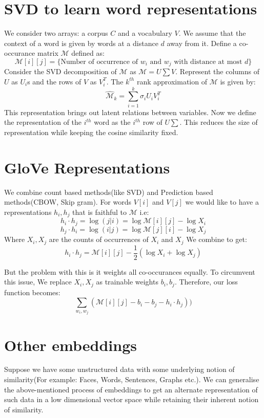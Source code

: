 \section{SVD to learn word representations}
We consider two arrays: a corpus $C$ and a vocabulary $V$. We assume that the context of a word is given by words at a distance $d$ away from it. Define a co-occurance matrix $\mathcal M$ defined as:
$$\mathcal M[i][j]=\{\text{Number of occurrence of }w_i\text{ and }w_j\text{ with distance at most }d\}$$
Consider the SVD decomposition of $\mathcal M$ as $\mathcal M=U\sum V$. Represent the columns of $U$ as $U_i$s and the rows of $V$ as $V_i^T$. The $k^{th}$ rank approximation of $\mathcal M$ is given by:
$$\hat{\mathcal M}_k=\sum_{i=1}^k \sigma_i U_iV_i^T $$
This representation brings out latent relations between variables. Now we define the representation  of the $i^{th}$ word as the $i^{th}$ row of $U\sum$. This reduces the size of representation while keeping the cosine similarity fixed.















\section{GloVe Representations}
We combine count based methods(like SVD) and Prediction based methods(CBOW, Skip gram). For words $V[i]$ and $V[j]$ we would like to have a representations $h_i,h_j$ that is faithful to $\mathcal M$ i.e:
$$h_i\cdot h_j =\log(j|i)=\log \mathcal M[i][j]-\log X_i$$
$$h_j\cdot h_i =\log(i|j)=\log \mathcal M[j][i]-\log X_j$$
Where $X_i,X_j$ are the counts of occurrences of $X_i$ and $X_j$
We combine to get:
$$h_i\cdot h_j=\mathcal{M}[i][j]-\frac{1}{2}\left(\log X_i+\log X_j\right)$$

But the problem with this is it weights all co-occurances equally. To circumvent this issue, We replace $X_i,X_j$ as trainable weights $b_i,b_j$. Therefore, our loss function becomes:
$$\sum_{w_i,w_j}\left(\mathcal M[i][j]-b_i-b_j-h_i\cdot h_j\right))$$ 















\section{Other embeddings}
Suppose we have some unstructured data with some underlying notion of similarity(For example: Faces, Words, Sentences, Graphs etc.). We can generalise the above-mentioned process of embeddings to get an alternate representation of such data in a low dimensional vector space while retaining their inherent notion of similarity.
